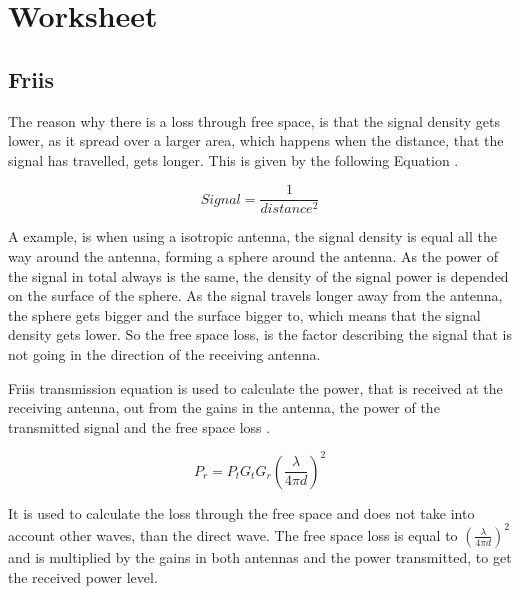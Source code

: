 \chapter{Worksheet}
\section{Friis}

The reason why there is a loss through free space, is that the signal density gets lower, as it spread over a larger area, which happens when the distance, that the signal has travelled, gets longer.  This is given by the following Equation \cite{friss_signal_dec}.

\begin{equation}
Signal = \frac{1}{distance^{2}}
\label{firss_signal decrease}
\end{equation}

A example, is when using a isotropic antenna, the signal density is equal all the way around the antenna, forming a sphere around the antenna. As the power of the signal in total always is the same, the density of the signal power is depended on the surface of the sphere. As the signal travels longer away from the antenna, the sphere gets bigger and the surface bigger to, which means that the signal density gets lower. So the free space loss, is the factor describing the signal that is not going in the direction of the receiving antenna.


Friis transmission equation is used to calculate the power, that is received at the receiving antenna, out from the gains in the antenna, the power of the transmitted signal and the free space loss \cite{friss_worksheet}. 

\begin{equation}
P_r = P_t G_t G_r (\frac{\lambda}{4 \pi d})^2
\end{equation}
\begin{where}
\end{where}

It is used to calculate the loss through the free space and does not take into account other waves, than the direct wave. The free space loss is equal to $(\frac{\lambda}{4 \pi d})^2$ and is multiplied by the gains in both antennas and the power transmitted, to get the received power level.

